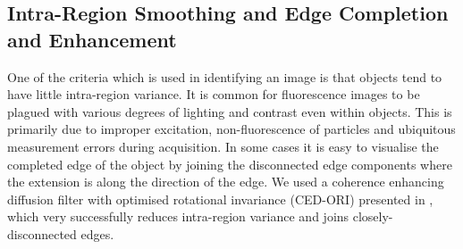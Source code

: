 


\subsection{Intra-Region Smoothing and Edge Completion and Enhancement}
\label{sec:Diffusion}

One of the criteria which is used in identifying an image is that objects tend to have little intra-region variance.
It is common for fluorescence images to be plagued with various degrees of lighting and contrast even within objects. This is primarily due to improper excitation, non-fluorescence of particles and ubiquitous measurement errors during acquisition.
In some cases it is easy to visualise the completed edge of the object by joining the disconnected edge components where the extension is along the direction of the edge.
We used a coherence enhancing diffusion filter with optimised rotational invariance (CED-ORI) presented in \citep{Weickert1999,Weickert2002,Weickert2003}, which very successfully reduces intra-region variance and joins closely-disconnected edges.


